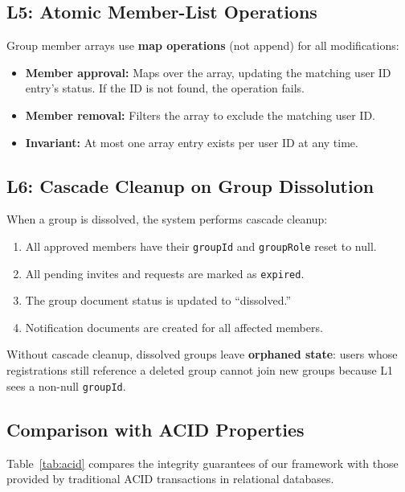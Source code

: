 \documentclass[11pt,a4paper]{article}
\theoremstyle{plain}
\theoremstyle{definition}
\begin{document}
\subsection{L5: Atomic Member-List Operations}

Group member arrays use \textbf{map operations} (not append) for all modifications:
\begin{itemize}[noitemsep,topsep=3pt]
    \item \textbf{Member approval:} Maps over the array, updating the matching user ID entry's status. If the ID is not found, the operation fails.
    \item \textbf{Member removal:} Filters the array to exclude the matching user ID.
    \item \textbf{Invariant:} At most one array entry exists per user ID at any time.
\end{itemize}

\subsection{L6: Cascade Cleanup on Group Dissolution}

When a group is dissolved, the system performs cascade cleanup:
\begin{enumerate}[noitemsep,topsep=3pt]
    \item All approved members have their \texttt{groupId} and \texttt{groupRole} reset to null.
    \item All pending invites and requests are marked as \texttt{expired}.
    \item The group document status is updated to ``dissolved.''
    \item Notification documents are created for all affected members.
\end{enumerate}

Without cascade cleanup, dissolved groups leave \textbf{orphaned state}: users whose registrations still reference a deleted group cannot join new groups because L1 sees a non-null \texttt{groupId}.

\subsection{Comparison with ACID Properties}

Table~\ref{tab:acid} compares the integrity guarantees of our framework with those provided by traditional ACID transactions in relational databases.
\end{document}
